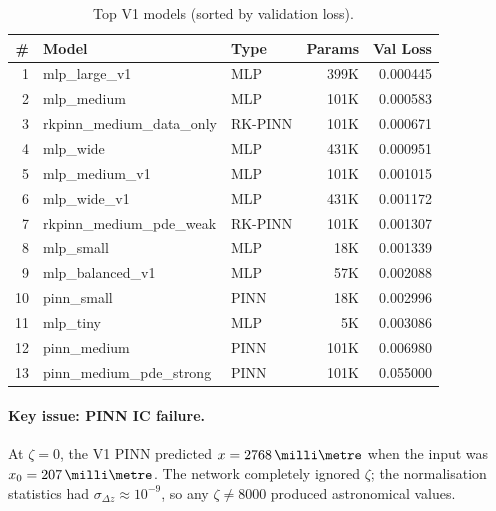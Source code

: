 \documentclass[11pt,a4paper]{article}
\newcommand{\SI}[2]{#1\,\text{#2}}
\newcommand{\zfrac}{\zeta}
\newcommand{\dz}{\Delta z}
\begin{document}
\begin{table}[H]
\centering
\caption{Top V1 models (sorted by validation loss).}
\label{tab:v1}
\begin{tabular}{@{} r l l r r @{}}
\toprule
\# & Model & Type & Params & Val Loss \\
\midrule
1 & mlp\_large\_v1 & MLP & 399K & 0.000445 \\
2 & mlp\_medium & MLP & 101K & 0.000583 \\
3 & rkpinn\_medium\_data\_only & RK-PINN & 101K & 0.000671 \\
4 & mlp\_wide & MLP & 431K & 0.000951 \\
5 & mlp\_medium\_v1 & MLP & 101K & 0.001015 \\
6 & mlp\_wide\_v1 & MLP & 431K & 0.001172 \\
7 & rkpinn\_medium\_pde\_weak & RK-PINN & 101K & 0.001307 \\
8 & mlp\_small & MLP & 18K & 0.001339 \\
9 & mlp\_balanced\_v1 & MLP & 57K & 0.002088 \\
10 & pinn\_small & PINN & 18K & 0.002996 \\
11 & mlp\_tiny & MLP & 5K & 0.003086 \\
12 & pinn\_medium & PINN & 101K & 0.006980 \\
13 & pinn\_medium\_pde\_strong & PINN & 101K & 0.055000 \\
\bottomrule
\end{tabular}
\end{table}

\paragraph{Key issue: PINN IC failure.}
At $\zfrac=0$, the V1 PINN predicted $x=\SI{2768}{\milli\metre}$ when
the input was $x_0=\SI{207}{\milli\metre}$.  The network completely ignored
$\zfrac$; the normalisation statistics had $\sigma_{\dz}\approx10^{-9}$,
so any $\zfrac\neq8000$ produced astronomical values.
\end{document}
